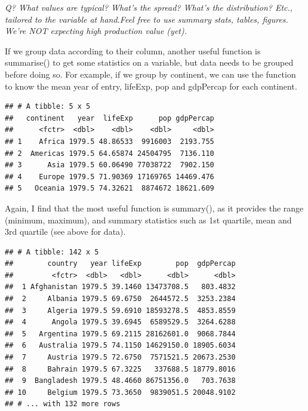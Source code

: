 \documentclass[]{article}
\newenvironment{Shaded}{\begin{snugshade}}{\end{snugshade}}
\newcommand{\KeywordTok}[1]{\textcolor[rgb]{0.13,0.29,0.53}{\textbf{{#1}}}}
\newcommand{\DataTypeTok}[1]{\textcolor[rgb]{0.13,0.29,0.53}{{#1}}}
\newcommand{\StringTok}[1]{\textcolor[rgb]{0.31,0.60,0.02}{{#1}}}
\newcommand{\OtherTok}[1]{\textcolor[rgb]{0.56,0.35,0.01}{{#1}}}
\newcommand{\NormalTok}[1]{{#1}}
\begin{document}
\emph{Q? What values are typical? What's the spread? What's the
distribution? Etc., tailored to the variable at hand.Feel free to use
summary stats, tables, figures. We're NOT expecting high production
value (yet).}

If we group data according to their column, another useful function is
summarise() to get some statistics on a variable, but data needs to be
grouped before doing so. For example, if we group by continent, we can
use the function to know the mean year of entry, lifeExp, pop and
gdpPercap for each continent.

\begin{Shaded}
\end{Shaded}

\begin{verbatim}
## # A tibble: 5 x 5
##   continent   year  lifeExp      pop gdpPercap
##      <fctr>  <dbl>    <dbl>    <dbl>     <dbl>
## 1    Africa 1979.5 48.86533  9916003  2193.755
## 2  Americas 1979.5 64.65874 24504795  7136.110
## 3      Asia 1979.5 60.06490 77038722  7902.150
## 4    Europe 1979.5 71.90369 17169765 14469.476
## 5   Oceania 1979.5 74.32621  8874672 18621.609
\end{verbatim}

Again, I find that the most useful function is summary(), as it provides
the range (minimum, maximum), and summary statistics such as 1st
quartile, mean and 3rd quartile (see above for data).

\begin{Shaded}
\end{Shaded}

\begin{verbatim}
## # A tibble: 142 x 5
##        country   year lifeExp        pop  gdpPercap
##         <fctr>  <dbl>   <dbl>      <dbl>      <dbl>
##  1 Afghanistan 1979.5 39.1460 13473708.5   803.4832
##  2     Albania 1979.5 69.6750  2644572.5  3253.2384
##  3     Algeria 1979.5 59.6910 18593278.5  4853.8559
##  4      Angola 1979.5 39.6945  6589529.5  3264.6288
##  5   Argentina 1979.5 69.2115 28162601.0  9068.7844
##  6   Australia 1979.5 74.1150 14629150.0 18905.6034
##  7     Austria 1979.5 72.6750  7571521.5 20673.2530
##  8     Bahrain 1979.5 67.3225   337688.5 18779.8016
##  9  Bangladesh 1979.5 48.4660 86751356.0   703.7638
## 10     Belgium 1979.5 73.3650  9839051.5 20048.9102
## # ... with 132 more rows
\end{verbatim}
\end{document}
